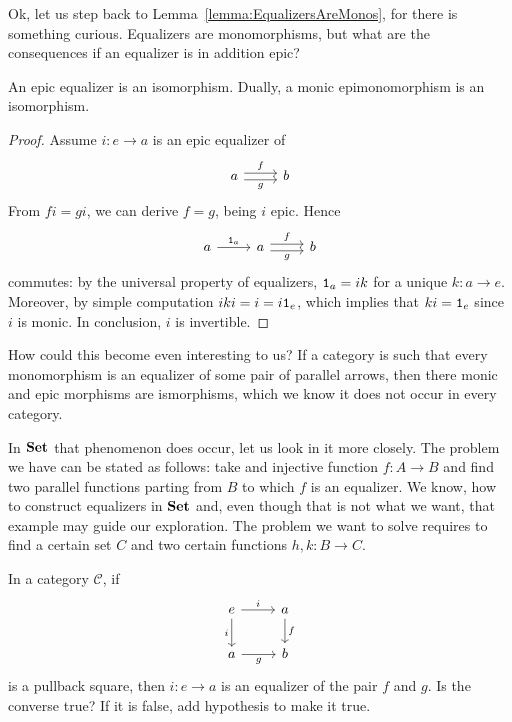 
Ok, let us step back to Lemma~\ref{lemma:EqualizersAreMonos}, for
there is something curious. Equalizers are monomorphisms, but what are
the consequences if an equalizer is in addition epic?

\begin{proposition}\label{proposition:EpicEqualizersAreIsomorphisms}
  An epic equalizer is an isomorphism. Dually, a monic epimonomorphism
  is an isomorphism.
\end{proposition}

\begin{proof}
  Assume \(i : e \to a\) is an epic equalizer of
  \[\begin{tikzcd} a \ar["f", r, shift left] \ar["g", r, shift right,
      swap] & b \end{tikzcd}\] From \(fi = gi\), we can derive
  \(f = g\), being \(i\) epic. Hence
  \[\begin{tikzcd} a \ar["{\id_a}", r] & a \ar["f", r, shift left]
      \ar["g", r, shift right, swap] & b \end{tikzcd}\] commutes: by
  the universal property of equalizers, \(\mathtt 1_a = ik\) for a unique
  \(k : a \to e\). Moreover, by simple computation
  \(iki = i = i \mathtt 1_e\), which implies that \(ki = \mathtt 1_e\) since \(i\)
  is monic. In conclusion, \(i\) is invertible.
\end{proof}

How could this become even interesting to us? If a category is such
that every monomorphism is an equalizer of some pair of parallel
arrows, then there monic and epic morphisms are ismorphisms, which we
know it does not occur in every category.

\begin{example}
  In \(\mathbf{Set}\) that phenomenon does occur, let us look in it more
  closely. The problem we have can be stated as follows: take and
  injective function \(f : A \to B\) and find two parallel functions
  parting from \(B\) to which \(f\) is an equalizer. We know, how to
  construct equalizers in \(\mathbf{Set}\) and, even though that is not what
  we want, that example may guide our exploration. The problem we want
  to solve requires to find a certain set \(C\) and two certain
  functions \(h, k : B \to C\). \YetToBeTeXed{}
\end{example}

\begin{exercise}
  In a category \(\mathcal{C}\), if
  \[\begin{tikzcd}
      e \ar["i", r] \ar["i", d, swap] & a \ar["f", d] \\
      a \ar["g", r, swap] & b
    \end{tikzcd}\] is a pullback square, then \(i : e \to a\) is an
  equalizer of the pair \(f\) and \(g\). Is the converse true? If it
  is false, add hypothesis to make it true.
\end{exercise}



